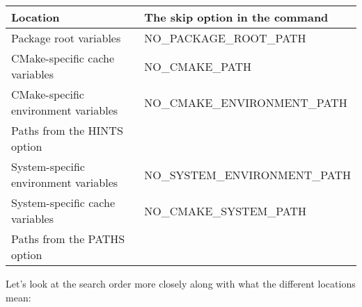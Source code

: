 \begin{table}[H]
	\centering
	\begin{tabular}{|l|l|}
		\hline
		\textbf{Location}                     & \textbf{The skip option in the command} \\ \hline
		Package root variables                & NO\_PACKAGE\_ROOT\_PATH                 \\ \hline
		CMake-specific cache variables        & NO\_CMAKE\_PATH                         \\ \hline
		CMake-specific environment variables  & NO\_CMAKE\_ENVIRONMENT\_PATH            \\ \hline
		Paths from the HINTS option           &                                         \\ \hline
		System-specific environment variables & NO\_SYSTEM\_ENVIRONMENT\_PATH           \\ \hline
		System-specific cache variables       & NO\_CMAKE\_SYSTEM\_PATH                 \\ \hline
		Paths from the PATHS option           &                                         \\ \hline
	\end{tabular}
\end{table}

Let's look at the search order more closely along with what the different locations mean:

